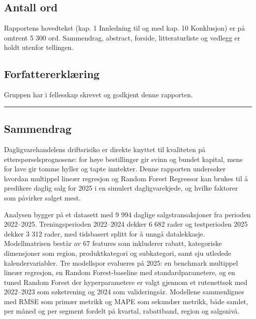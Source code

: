 \documentclass[
  11pt,
]{article}
\begin{document}
\hypertarget{antall-ord}{%
\subsection{\texorpdfstring{Antall ord }{Antall ord }}\label{antall-ord}}

Rapportens hovedtekst (kap. 1 Innledning til og med kap. 10 Konklusjon) er på omtrent 5 300 ord. Sammendrag, abstract,
forside, litteraturliste og vedlegg er holdt utenfor tellingen.

\hypertarget{forfattererkluxe6ring}{%
\subsection{\texorpdfstring{Forfattererklæring }{Forfattererklæring }}\label{forfattererkluxe6ring}}

Gruppen har i fellesskap skrevet og godkjent denne rapporten.

\begin{center}\rule{0.5\linewidth}{0.5pt}\end{center}

\hypertarget{sammendrag}{%
\subsection{\texorpdfstring{Sammendrag }{Sammendrag }}\label{sammendrag}}

Dagligvarehandelens driftsrisiko er direkte knyttet til kvaliteten på etterspørselsprognosene: for høye bestillinger gir
svinn og bundet kapital, mens for lave gir tomme hyller og tapte inntekter. Denne rapporten undersøker hvordan multippel
lineær regresjon og Random Forest Regressor kan brukes til å predikere daglig salg for 2025 i en simulert
dagligvarekjede, og hvilke faktorer som påvirker salget mest.

Analysen bygger på et datasett med 9 994 daglige salgstransaksjoner fra perioden 2022--2025. Treningsperioden 2022--2024
dekker 6 682 rader og testperioden 2025 dekker 3 312 rader, med tidsbasert splitt for å unngå datalekkasje.
Modellmatrisen består av 67 features som inkluderer rabatt, kategoriske dimensjoner som region, produktkategori og
subkategori, samt sju utledede kalendervariabler. Tre modellspor evalueres på 2025: en benchmark multippel lineær
regresjon, en Random Forest-baseline med standardparametere, og en tuned Random Forest der hyperparametere er valgt
gjennom et rutenettsøk med 2022--2023 som søketrening og 2024 som valideringsår. Modellene sammenlignes med RMSE som
primær metrikk og MAPE som sekundær metrikk, både samlet, per måned og per segment fordelt på kvartal, rabattband,
region og salgsnivå.
\end{document}
